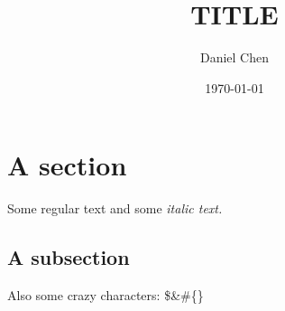 \documentclass{article}%
\title{TITLE}%
\author{Daniel Chen}%
\date{\today}%
\begin{document}
%
\normalsize%
\maketitle%
\section{A section}%
\label{sec:Asection}%
Some regular text and some %
\textit{italic text. }%
\subsection{A subsection}%
\label{subsec:Asubsection}%
Also some crazy characters: \$\&\#\{\}

%
\end{document}
